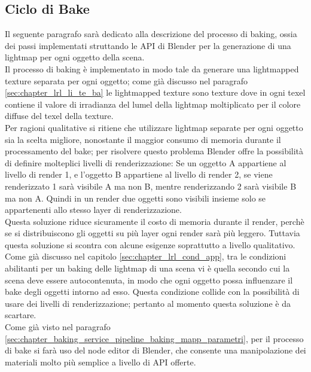 \subsection{Ciclo di Bake}
\label{sec:chapter_baking_service_pipeline_baking_ciclo_bake}

Il seguente paragrafo sarà dedicato alla descrizione del processo di baking, ossia dei passi implementati struttando le API di Blender per la generazione di una lightmap per ogni oggetto della scena.
\\ 
Il processo di baking è implementato in modo tale da generare una lightmapped texture separata per ogni oggetto; come già discusso nel paragrafo \ref{sec:chapter_lrl_li_te_ba} le lightmapped texture sono texture dove in ogni texel contiene il valore di irradianza del lumel della lightmap moltiplicato per il colore diffuse del texel della texture. 
\\
Per ragioni qualitative si ritiene che utilizzare lightmap separate per ogni oggetto sia la scelta migliore, nonostante il maggior consumo di memoria durante il processamento del bake; per risolvere questo problema Blender offre la possibilità di definire molteplici livelli di renderizzazione: 
Se un oggetto A appartiene al livello di render 1, e l’oggetto B appartiene al livello di render 2, se viene renderizzato 1 sarà visibile A ma non B, mentre renderizzando 2 sarà visibile B ma non A. Quindi in un render due oggetti sono visibili insieme solo se appartenenti allo stesso layer di renderizzazione. 
\\
Questa soluzione riduce sicuramente il costo di memoria durante il render, perchè se si distribuiscono gli oggetti su più layer ogni render sarà più leggero. Tuttavia questa soluzione si scontra con alcune esigenze soprattutto a livello qualitativo. 
\\
Come già discusso nel capitolo \ref{sec:chapter_lrl_cond_app}, tra le condizioni abilitanti per un baking delle lightmap di una scena vi è quella secondo cui la scena deve essere autocontenuta, in modo che ogni oggetto possa influenzare il bake degli oggetti intorno ad esso. Questa condizione collide con la possibilità di usare dei livelli di renderizzazione; pertanto al momento questa soluzione è da scartare.
\\
Come già visto nel paragrafo \ref{sec:chapter_baking_service_pipeline_baking_mapp_parametri}, per il processo di bake si farà uso del node editor di Blender, che consente una manipolazione dei materiali molto più semplice a livello di API offerte. 
\\
